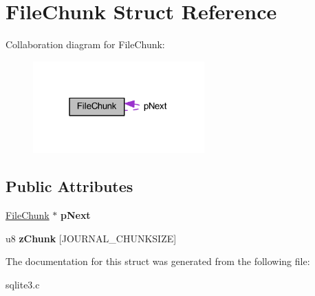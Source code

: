 \hypertarget{struct_file_chunk}{\section{File\-Chunk Struct Reference}
\label{struct_file_chunk}
}


Collaboration diagram for File\-Chunk\-:\nopagebreak
\begin{figure}[H]
\begin{center}
\leavevmode
\includegraphics[width=187pt]{struct_file_chunk__coll__graph}
\end{center}
\end{figure}
\subsection*{Public Attributes}
\begin{DoxyCompactItemize}
\item 
\hypertarget{struct_file_chunk_ad2d0d170afc7ce1e239e8716852e247b}{\hyperlink{struct_file_chunk}{File\-Chunk} $\ast$ {\bfseries p\-Next}}\label{struct_file_chunk_ad2d0d170afc7ce1e239e8716852e247b}

\item 
\hypertarget{struct_file_chunk_ada06a9958ee6b82a6c2b15c29f847d19}{u8 {\bfseries z\-Chunk} \mbox{[}J\-O\-U\-R\-N\-A\-L\-\_\-\-C\-H\-U\-N\-K\-S\-I\-Z\-E\mbox{]}}\label{struct_file_chunk_ada06a9958ee6b82a6c2b15c29f847d19}

\end{DoxyCompactItemize}


The documentation for this struct was generated from the following file\-:\begin{DoxyCompactItemize}
\item 
sqlite3.\-c\end{DoxyCompactItemize}
